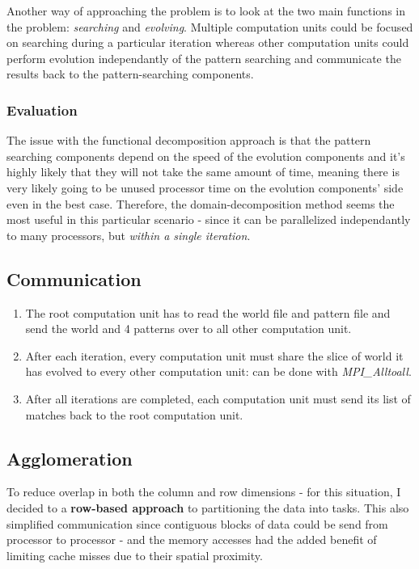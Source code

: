 \documentclass[12pt,a4paper]{article}
\begin{document}
Another way of approaching the problem is to look at the two main functions in the problem: \textit{searching} and \textit{evolving}. Multiple computation units could be focused on searching during a particular iteration whereas other computation units could perform evolution independantly of the pattern searching and communicate the results back to the pattern-searching components. 

\subsubsection{Evaluation}
The issue with the functional decomposition approach is that the pattern searching components depend on the speed of the evolution components and it's highly likely that they will not take the same amount of time, meaning there is very likely going to be unused processor time on the evolution components' side even in the best case. Therefore, the domain-decomposition method seems the most useful in this particular scenario - since it can be parallelized independantly to many processors, but \textit{within a single iteration}.

\newpage

\subsection{Communication}

\begin{enumerate}
\item{The root computation unit has to read the world file and pattern file and send the world and 4 patterns over to all other computation unit.}
\item{After each iteration, every computation unit must share the slice of world it has evolved to every other computation unit: can be done with \textit{MPI\_Alltoall}.}
\item{After all iterations are completed, each computation unit must send its list of matches back to the root computation unit.}
\end{enumerate}

\subsection{Agglomeration}
To reduce overlap in both the column and row dimensions - for this situation, I decided to a \textbf{row-based approach} to partitioning the data into tasks. This also simplified communication since contiguous blocks of data could be send from processor to processor - and the memory accesses had the added benefit of limiting cache misses due to their spatial proximity. \\
\end{document}
